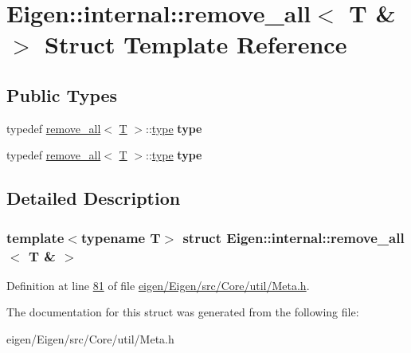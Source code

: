\hypertarget{struct_eigen_1_1internal_1_1remove__all_3_01_t_01_6_01_4}{}\section{Eigen\+:\+:internal\+:\+:remove\+\_\+all$<$ T \& $>$ Struct Template Reference}
\label{struct_eigen_1_1internal_1_1remove__all_3_01_t_01_6_01_4}
\subsection*{Public Types}
\begin{DoxyCompactItemize}
\item 
\mbox{\label{struct_eigen_1_1internal_1_1remove__all_3_01_t_01_6_01_4_abc07582f72a90e08a201f91760b34682}} 
typedef \hyperlink{struct_eigen_1_1internal_1_1remove__all}{remove\+\_\+all}$<$ \hyperlink{group___sparse_core___module}{T} $>$\+::\hyperlink{group___sparse_core___module}{type} {\bfseries type}
\item 
\mbox{\label{struct_eigen_1_1internal_1_1remove__all_3_01_t_01_6_01_4_abc07582f72a90e08a201f91760b34682}} 
typedef \hyperlink{struct_eigen_1_1internal_1_1remove__all}{remove\+\_\+all}$<$ \hyperlink{group___sparse_core___module}{T} $>$\+::\hyperlink{group___sparse_core___module}{type} {\bfseries type}
\end{DoxyCompactItemize}


\subsection{Detailed Description}
\subsubsection*{template$<$typename T$>$\newline
struct Eigen\+::internal\+::remove\+\_\+all$<$ T \& $>$}



Definition at line \hyperlink{eigen_2_eigen_2src_2_core_2util_2_meta_8h_source_l00081}{81} of file \hyperlink{eigen_2_eigen_2src_2_core_2util_2_meta_8h_source}{eigen/\+Eigen/src/\+Core/util/\+Meta.\+h}.



The documentation for this struct was generated from the following file\+:\begin{DoxyCompactItemize}
\item 
eigen/\+Eigen/src/\+Core/util/\+Meta.\+h\end{DoxyCompactItemize}
